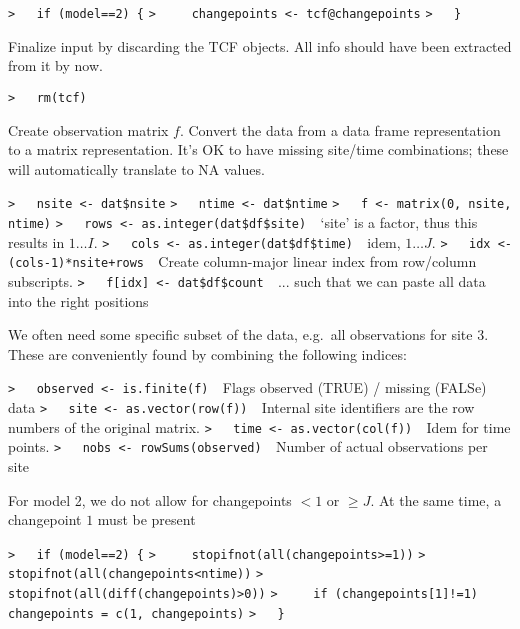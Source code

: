\documentclass[a4paper]{article}
\begin{document}
\verb~>   if (model==2) {~\newline
\verb~>     changepoints <- tcf@changepoints~\newline
\verb~>   }~\par

Finalize input by discarding the TCF objects.
All info should have been extracted from it by now.\par
\verb~>   rm(tcf)~\par

Create observation matrix $f$.
Convert the data from a data frame representation to a matrix representation.
It's OK to have missing site/time combinations; these will automatically
translate to NA values.\par
\verb~>   nsite <- dat$nsite~\newline
\verb~>   ntime <- dat$ntime~\newline
\verb~>   f <- matrix(0, nsite, ntime)~\newline
\verb~>   rows <- as.integer(dat$df$site)  ~{\sffamily `site' is a factor, thus this results in $1\ldots I$.}\newline
\verb~>   cols <- as.integer(dat$df$time)  ~{\sffamily idem, $1 \ldots J$.}\newline
\verb~>   idx <- (cols-1)*nsite+rows  ~{\sffamily Create column-major linear index from row/column subscripts.}\newline
\verb~>   f[idx] <- dat$df$count  ~{\sffamily ... such that we can paste all data into the right positions}\par

We often need some specific subset of the data, e.g.\ all observations for site 3.
These are conveniently found by combining the following indices:\par
\verb~>   observed <- is.finite(f)  ~{\sffamily Flags observed (TRUE) / missing (FALSe) data}\newline
\verb~>   site <- as.vector(row(f))  ~{\sffamily Internal site identifiers are the row numbers of the original matrix.}\newline
\verb~>   time <- as.vector(col(f))  ~{\sffamily Idem for time points.}\newline
\verb~>   nobs <- rowSums(observed)  ~{\sffamily Number of actual observations per site}\par

For model 2, we do not allow for changepoints $<1$ or $\geq J$. At the same time,
a changepoint $1$ must be present\par
\verb~>   if (model==2) {~\newline
\verb~>     stopifnot(all(changepoints>=1))~\newline
\verb~>     stopifnot(all(changepoints<ntime))~\newline
\verb~>     stopifnot(all(diff(changepoints)>0))~\newline
\verb~>     if (changepoints[1]!=1) changepoints = c(1, changepoints)~\newline
\verb~>   }~\par
\end{document}
